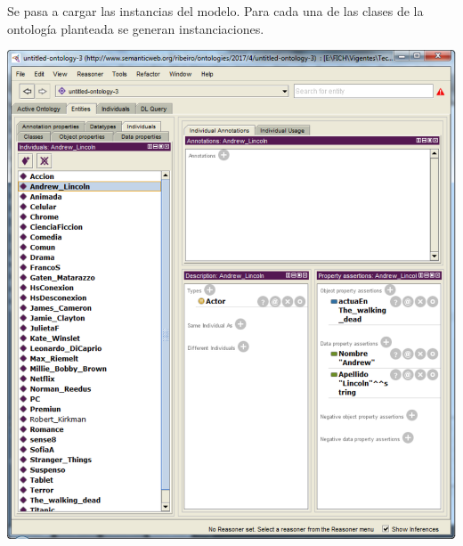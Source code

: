 \documentclass[a4paper,10pt,spanish,oneside]{article}
\begin{document}
\begin{minipage}{0.3\linewidth}

Se pasa a cargar las instancias del modelo. Para cada una de las clases de la ontología planteada se generan instanciaciones.

\end{minipage} \hfill \begin{minipage}{0.65\linewidth}

\begin{center}
\includegraphics[width=\linewidth]{4}
\end{center}

\end{minipage}
\end{document}

